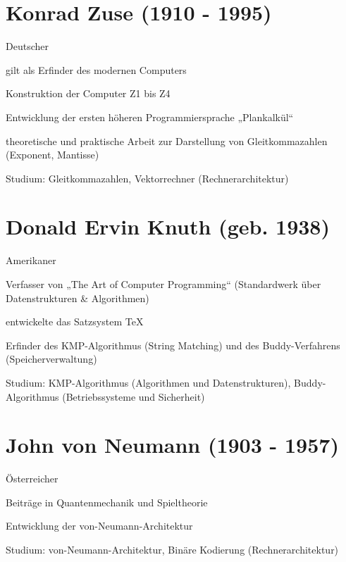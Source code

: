 \documentclass[a4paper,12pt]{scrreprt}
\begin{document}
\section*{Konrad Zuse (1910 - 1995)}
\begin{itemize*}
    \item Deutscher
    \item gilt als Erfinder des modernen Computers
    \item Konstruktion der Computer Z1 bis Z4
    \item Entwicklung der ersten höheren Programmiersprache „Plankalkül“
    \item theoretische und praktische Arbeit zur Darstellung von Gleitkommazahlen (Exponent,
          Mantisse)
    \item Studium: Gleitkommazahlen, Vektorrechner (Rechnerarchitektur)
\end{itemize*}

\section*{Donald Ervin Knuth (geb. 1938)}
\begin{itemize*}
    \item Amerikaner
    \item Verfasser von „The Art of Computer Programming“ (Standardwerk über Datenstrukturen \&
          Algorithmen)
    \item entwickelte das Satzsystem TeX
    \item Erfinder des KMP-Algorithmus (String Matching) und des Buddy-Verfahrens
          (Speicherverwaltung)
    \item Studium: KMP-Algorithmus (Algorithmen und Datenstrukturen), Buddy-Algorithmus
          (Betriebssysteme und Sicherheit)
\end{itemize*}

\section*{John von Neumann (1903 - 1957)}
\begin{itemize*}
    \item Österreicher
    \item Beiträge in Quantenmechanik und Spieltheorie
    \item Entwicklung der von-Neumann-Architektur
    \item Studium: von-Neumann-Architektur, Binäre Kodierung (Rechnerarchitektur)
\end{itemize*}
\end{document}
